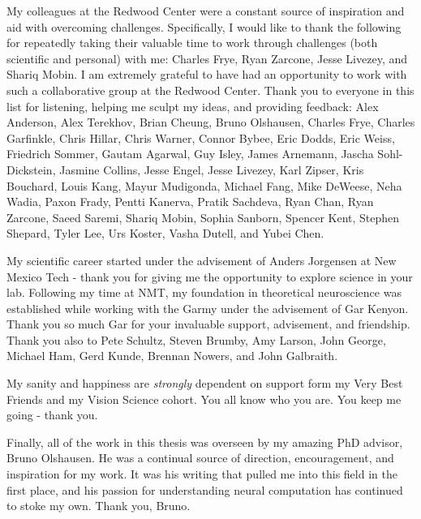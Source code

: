 \documentclass{ucbthesis}
\begin{document}
\begin{frontmatter}
\begin{acknowledgements}
My colleagues at the Redwood Center were a constant source of inspiration and aid with overcoming challenges. Specifically, I would like to thank the following for repeatedly taking their valuable time to work through challenges (both scientific and personal) with me: Charles Frye, Ryan Zarcone, Jesse Livezey, and Shariq Mobin. I am extremely grateful to have had an opportunity to work with such a collaborative group at the Redwood Center. Thank you to everyone in this list for listening, helping me sculpt my ideas, and providing feedback: Alex Anderson, Alex Terekhov, Brian Cheung, Bruno Olshausen, Charles Frye, Charles Garfinkle, Chris Hillar, Chris Warner, Connor Bybee, Eric Dodds, Eric Weiss, Friedrich Sommer, Gautam Agarwal, Guy Isley, James Arnemann, Jascha Sohl-Dickstein, Jasmine Collins, Jesse Engel, Jesse Livezey, Karl Zipser, Kris Bouchard, Louis Kang, Mayur Mudigonda, Michael Fang, Mike DeWeese, Neha Wadia, Paxon Frady, Pentti Kanerva, Pratik Sachdeva, Ryan Chan, Ryan Zarcone, Saeed Saremi, Shariq Mobin, Sophia Sanborn, Spencer Kent, Stephen Shepard, Tyler Lee, Urs Koster, Vasha Dutell, and Yubei Chen.

My scientific career started under the advisement of Anders Jorgensen at New Mexico Tech - thank you for giving me the opportunity to explore science in your lab. Following my time at NMT, my foundation in theoretical neuroscience was established while working with the Garmy under the advisement of Gar Kenyon. Thank you so much Gar for your invaluable support, advisement, and friendship. Thank you also to Pete Schultz, Steven Brumby, Amy Larson, John George, Michael Ham, Gerd Kunde, Brennan Nowers, and John Galbraith.

My sanity and happiness are \textit{strongly} dependent on support form my Very Best Friends and my Vision Science cohort. You all know who you are. You keep me going - thank you.

Finally, all of the work in this thesis was overseen by my amazing PhD advisor, Bruno Olshausen. He was a continual source of direction, encouragement, and inspiration for my work. It was his writing that pulled me into this field in the first place, and his passion for understanding neural computation has continued to stoke my own. Thank you, Bruno.
\end{acknowledgements}

\end{frontmatter}

\pagestyle{headings}


\label{ch:intro}
\label{ch:lca}
\label{ch:hierarchical_sc}
\label{ch:iso}
\label{ch:conclusion}


\clearpage
\printbibliography
\end{document}
